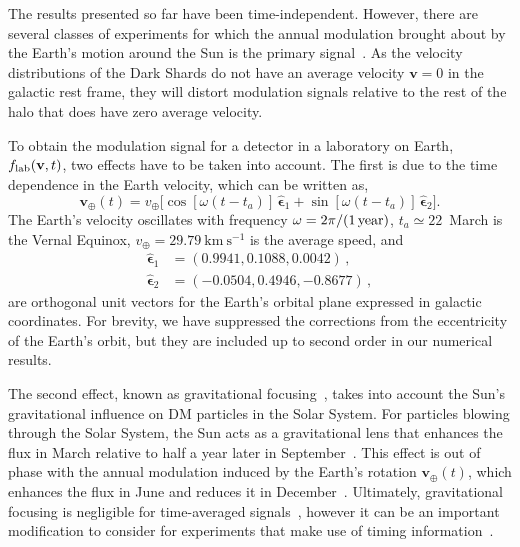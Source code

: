 \documentclass[prd,10pt,twocolumn,showpacs,nofootinbib,aps,superscriptaddress,preprintnumbers]{revtex4-1}
\newcommand{\epsa}{\hat{\boldsymbol{\epsilon}}_1}
\newcommand{\epsb}{\hat{\boldsymbol{\epsilon}}_2}
\begin{document}
  The results presented so far have been time-independent. However,
  there are several classes of experiments for which the annual
  modulation brought about by the Earth's motion around the Sun is the
  primary signal~\cite{Drukier:1986tm,Freese:1987wu}. As the velocity
  distributions of the Dark Shards do not have an average velocity
  $\mathbf{v}=0$ in the galactic rest frame, they will distort
  modulation signals relative to the rest of the halo that does have
  zero average velocity.

  To obtain the modulation signal for a detector in a laboratory on
  Earth, $f_{\rm{lab}}(\mathbf{v},t)$, two effects have to be taken into
  account. The first is due to the time dependence in the Earth
  velocity, which can be written as,
  \begin{equation}
  \mathbf{v}_\oplus(t) = v_\oplus \bigg[ \cos{\left[\omega(t-t_a)\right]}\, \epsa + \sin{\left[\omega (t-t_a)\right]} \,\epsb \bigg].
  \end{equation}
  The Earth's velocity oscillates with frequency $\omega = 2\pi/(1\,{\rm
    year})$, $t_a\simeq 22$~March is the Vernal Equinox, $v_\oplus =
  29.79~\mathrm{km}~\!\mathrm{s}^{-1}$ is the average speed, and
  \begin{align}\label{eq:orbitvectors}
  \epsa &= (0.9941, 0.1088, 0.0042)  \, , \\ 
  \epsb &= (-0.0504, 0.4946, -0.8677) \, ,
  \end{align}
  are orthogonal unit vectors for the Earth's orbital plane expressed in galactic coordinates. For brevity, we have suppressed the corrections from the eccentricity
  of the Earth's orbit, but they are included up to second order in our
  numerical results.

  The second effect, known as gravitational
  focusing~\cite{Griest:1987vc,Sikivie:2002bj,Alenazi:2006wu,Lee:2013wza,Bozorgnia:2014dqa,DelNobile:2015nua},
  takes into account the Sun's gravitational influence on DM
  particles in the Solar System. For particles blowing through the Solar
  System, the Sun acts as a gravitational lens that enhances the flux in
  March relative to half a year later in
  September~\cite{Griest:1987vc,Lee:2013wza}. This effect is out of
  phase with the annual modulation induced by the Earth's rotation
  $\mathbf{v}_\oplus(t)$, which enhances the flux in June and reduces it
  in December~\cite{Freese:1987wu}. Ultimately, gravitational focusing is
  negligible for time-averaged
  signals~\cite{Alenazi:2006wu}, however it can be an important
  modification to consider for experiments that make use of timing
  information~\cite{Lee:2013wza}.
\end{document}
